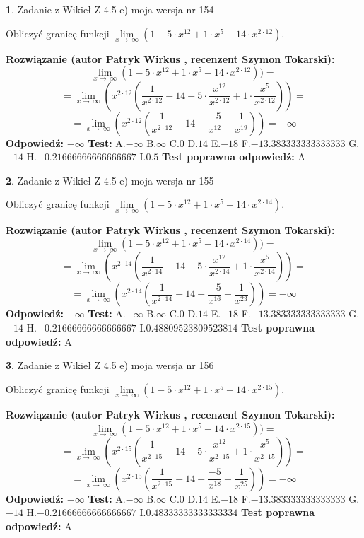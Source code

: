 \documentclass[12pt, a4paper]{article}
\theoremstyle{definition} %
\newtheorem{zad}{}
\newcommand{\zadStart}[1]{\begin{zad}#1\newline}
\newcommand{\zadStop}{\end{zad}}
\newcommand{\rozwStart}[2]{\noindent \textbf{Rozwiązanie (autor #1 , recenzent #2): }\newline}
\newcommand{\rozwStop}{\newline}
\newcommand{\odpStart}{\noindent \textbf{Odpowiedź:}\newline}
\newcommand{\odpStop}{\newline}
\newcommand{\testStart}{\noindent \textbf{Test:}\newline}
\newcommand{\testStop}{\newline}
\newcommand{\kluczStart}{\noindent \textbf{Test poprawna odpowiedź:}\newline}
\newcommand{\kluczStop}{\newline}
\begin{document}
\zadStart{Zadanie z Wikieł Z 4.5 e) moja wersja nr 154}


Obliczyć granicę funkcji  $\lim\limits_{x\to\ \infty}(1 - 5 \cdot x^{12}+1 \cdot x^{5}- 14 \cdot x^{2\cdot12})$.
\zadStop
\rozwStart{Patryk Wirkus}{Szymon Tokarski}
$$\lim\limits_{x\to\ \infty}(1 - 5 \cdot x^{12}+1 \cdot x^{5}- 14 \cdot x^{2\cdot12}))=$$
$$=\lim\limits_{x\to\ \infty}(x^{2\cdot12}(\frac{1}{x^{2\cdot12}}-14 -5 \cdot \frac{x^{12}}{x^{2\cdot12}}+1 \cdot \frac{x^{5}}{x^{2\cdot12}}))=$$
$$=\lim\limits_{x\to\ \infty}(x^{2\cdot12}(\frac{1}{x^{2\cdot12}}-14 + \frac{-5}{x^{12}}+ \frac{1}{x^{19}}))=-\infty$$
\rozwStop
\odpStart
$-\infty$
\odpStop
\testStart
A.$-\infty$ B.$\infty$ C.$0$ D.$14$ E.$-18$
F.$-13.383333333333333$ G.$-14$
H.$-0.21666666666666667$
I.$0.5$
\testStop
\kluczStart
A
\kluczStop



\zadStart{Zadanie z Wikieł Z 4.5 e) moja wersja nr 155}


Obliczyć granicę funkcji  $\lim\limits_{x\to\ \infty}(1 - 5 \cdot x^{12}+1 \cdot x^{5}- 14 \cdot x^{2\cdot14})$.
\zadStop
\rozwStart{Patryk Wirkus}{Szymon Tokarski}
$$\lim\limits_{x\to\ \infty}(1 - 5 \cdot x^{12}+1 \cdot x^{5}- 14 \cdot x^{2\cdot14}))=$$
$$=\lim\limits_{x\to\ \infty}(x^{2\cdot14}(\frac{1}{x^{2\cdot14}}-14 -5 \cdot \frac{x^{12}}{x^{2\cdot14}}+1 \cdot \frac{x^{5}}{x^{2\cdot14}}))=$$
$$=\lim\limits_{x\to\ \infty}(x^{2\cdot14}(\frac{1}{x^{2\cdot14}}-14 + \frac{-5}{x^{16}}+ \frac{1}{x^{23}}))=-\infty$$
\rozwStop
\odpStart
$-\infty$
\odpStop
\testStart
A.$-\infty$ B.$\infty$ C.$0$ D.$14$ E.$-18$
F.$-13.383333333333333$ G.$-14$
H.$-0.21666666666666667$
I.$0.48809523809523814$
\testStop
\kluczStart
A
\kluczStop



\zadStart{Zadanie z Wikieł Z 4.5 e) moja wersja nr 156}


Obliczyć granicę funkcji  $\lim\limits_{x\to\ \infty}(1 - 5 \cdot x^{12}+1 \cdot x^{5}- 14 \cdot x^{2\cdot15})$.
\zadStop
\rozwStart{Patryk Wirkus}{Szymon Tokarski}
$$\lim\limits_{x\to\ \infty}(1 - 5 \cdot x^{12}+1 \cdot x^{5}- 14 \cdot x^{2\cdot15}))=$$
$$=\lim\limits_{x\to\ \infty}(x^{2\cdot15}(\frac{1}{x^{2\cdot15}}-14 -5 \cdot \frac{x^{12}}{x^{2\cdot15}}+1 \cdot \frac{x^{5}}{x^{2\cdot15}}))=$$
$$=\lim\limits_{x\to\ \infty}(x^{2\cdot15}(\frac{1}{x^{2\cdot15}}-14 + \frac{-5}{x^{18}}+ \frac{1}{x^{25}}))=-\infty$$
\rozwStop
\odpStart
$-\infty$
\odpStop
\testStart
A.$-\infty$ B.$\infty$ C.$0$ D.$14$ E.$-18$
F.$-13.383333333333333$ G.$-14$
H.$-0.21666666666666667$
I.$0.48333333333333334$
\testStop
\kluczStart
A
\kluczStop
\end{document}
